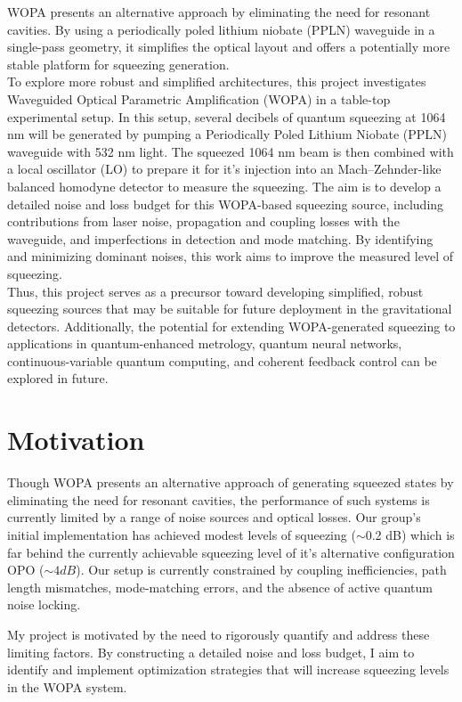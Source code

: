 \documentclass[colorlinks=true,pdfstartview=FitV,linkcolor=blue,
citecolor=red,urlcolor=magenta]{ligodoc}
\begin{document}
WOPA presents an alternative approach by eliminating the need for resonant cavities. By using a periodically poled lithium niobate (PPLN) waveguide in a single-pass geometry, it simplifies the optical layout and offers a potentially more stable platform for squeezing generation.\\
 To explore more robust and simplified architectures, this project investigates Waveguided Optical Parametric Amplification (WOPA) in a table-top experimental setup. In this setup, several decibels of quantum squeezing at 1064 nm will be generated by pumping a Periodically Poled Lithium Niobate (PPLN)
waveguide with 532 nm light. The squeezed 1064 nm beam is then combined
with a local oscillator (LO) to prepare it for it's injection into an Mach–Zehnder-like balanced homodyne detector to measure the squeezing. The aim is to develop a detailed noise and loss budget for this WOPA-based squeezing source, including contributions from laser noise, propagation and coupling losses with the waveguide, and imperfections in detection and mode matching. By identifying and minimizing dominant noises, this work aims to improve the measured level of squeezing.\\
Thus, this project serves as a precursor toward developing simplified, robust squeezing sources that may be suitable for future deployment in the gravitational detectors. Additionally, the potential for extending WOPA-generated squeezing to applications in quantum-enhanced metrology, quantum neural networks, continuous-variable quantum computing, and coherent feedback control can be explored in future.

\section{Motivation}


Though WOPA presents an alternative approach of generating squeezed states by eliminating the need for resonant cavities, the performance of such systems is currently limited by a range of noise sources and optical losses. Our group’s initial implementation has achieved modest levels of squeezing ($\sim$0.2 dB) which is far behind the currently achievable squeezing level of it's alternative configuration OPO ($\sim 4 dB$). Our setup is currently constrained by coupling inefficiencies, path length mismatches, mode-matching errors, and the absence of active quantum noise locking.

My project is motivated by the need to rigorously quantify and address these limiting factors. By constructing a detailed noise and loss budget, I aim to identify and implement optimization strategies that will increase squeezing levels in the WOPA system. 
\end{document}
